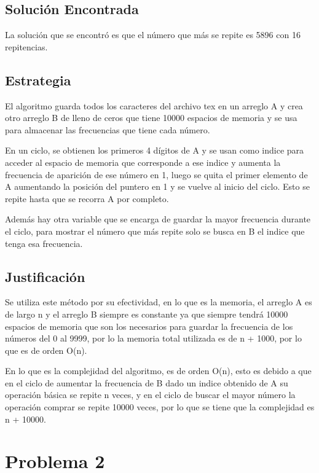 \documentclass[10pt,letterpaper]{article}
\begin{document}
\subsection{Solución Encontrada}

La solución que se encontró es que el número que más se repite es 5896 con 16 repitencias.


\subsection{Estrategia}

El algoritmo guarda todos los caracteres del archivo tex en un arreglo A y crea otro arreglo B de lleno de ceros que tiene 10000 espacios de memoria y se usa para almacenar las frecuencias que tiene cada número.

En un ciclo, se obtienen los primeros 4 dígitos de A y se usan como indice para acceder al espacio de memoria que corresponde a ese indice y aumenta la frecuencia de aparición de ese número en 1, luego se quita el primer elemento de A aumentando la posición del puntero en 1 y se vuelve al inicio del ciclo. Esto se repite hasta que se recorra A por completo.


Además hay otra variable que se encarga de guardar la mayor frecuencia durante el ciclo, para mostrar el número que más repite solo se busca en B el indice que tenga esa frecuencia.

\subsection{Justificación}

Se utiliza este método por su efectividad, en lo que es la memoria, el arreglo A es de largo n y el arreglo B siempre es constante ya que siempre tendrá 10000 espacios de memoria que son los necesarios para guardar la frecuencia de los números del 0 al 9999, por lo la memoria total utilizada es de n + 1000, por lo que es de orden O(n).

En lo que es la complejidad del algoritmo, es de orden O(n), esto es debido a que en el ciclo de aumentar la frecuencia de B dado un indice obtenido de A su operación básica se repite n veces, y en el ciclo de buscar el mayor número la operación comprar se repite 10000 veces, por lo que se tiene que la complejidad es n + 10000.

\newpage

\section{Problema 2}
\end{document}
